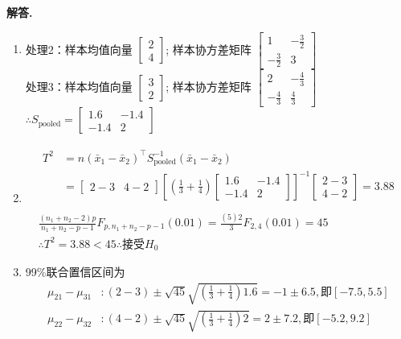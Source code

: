 \documentclass[12pt, a4paper, oneside]{ctexart}
\newenvironment{solution}{\par\noindent\textbf{解答. }}{\par}
\begin{document}
\begin{solution}
    \begin{enumerate}[label=(\alph*)]
        \item 
        处理2：样本均值向量 $\begin{bmatrix} 2 \\ 4 \end{bmatrix}$;
        样本协方差矩阵 $\begin{bmatrix} 1 & -\frac{3}{2} \\ -\frac{3}{2} & 3 \end{bmatrix}$\\
        处理3：样本均值向量 $\begin{bmatrix} 3 \\ 2 \end{bmatrix}$;
        样本协方差矩阵 $\begin{bmatrix} 2 & -\frac{4}{3} \\ -\frac{4}{3} & \frac{4}{3} \end{bmatrix}$\\
        $\therefore S_{\mathrm{pooled}}=\begin{bmatrix} 1.6 & -1.4 \\ -1.4 & 2 \end{bmatrix}$
        \item
        \[
        \begin{gathered}
        \begin{aligned}
            T^2&=n(\bar{x}_1-\bar{x}_2)^\top S_{\mathrm{pooled}}^{-1}(\bar{x}_1-\bar{x}_2)\\
            &=\begin{bmatrix} 2-3 & 4-2 \end{bmatrix} \left[ \left(\frac{1}{3}+\frac{1}{4}\right)\begin{bmatrix} 1.6 & -1.4 \\ -1.4 & 2 \end{bmatrix} \right]^{-1} \begin{bmatrix} 2-3 \\ 4-2 \end{bmatrix}=3.88\\
        \end{aligned}\\
        \frac{(n_1+n_2-2)p}{n_1+n_2-p-1} F_{p,n_1+n_2-p-1}(0.01)=\frac{(5)2}{3}F_{2,4}(0.01)=45\\
        \therefore T^2=3.88<45 \therefore \text{接受}H_0
        \end{gathered}
        \]
        \item 
        99\%联合置信区间为
        \[
        \begin{aligned}
            \mu_{21}-\mu_{31}&:(2-3)\pm\sqrt{45}\sqrt{\left(\frac{1}{3}+\frac{1}{4}\right)1.6}=-1\pm 6.5,\text{即}[-7.5, 5.5]\\
            \mu_{22}-\mu_{32}&:(4-2)\pm\sqrt{45}\sqrt{\left(\frac{1}{3}+\frac{1}{4}\right)2}=2\pm 7.2,\text{即}[-5.2, 9.2]
        \end{aligned}
        \]
    \end{enumerate}
\end{solution}
\end{document}
